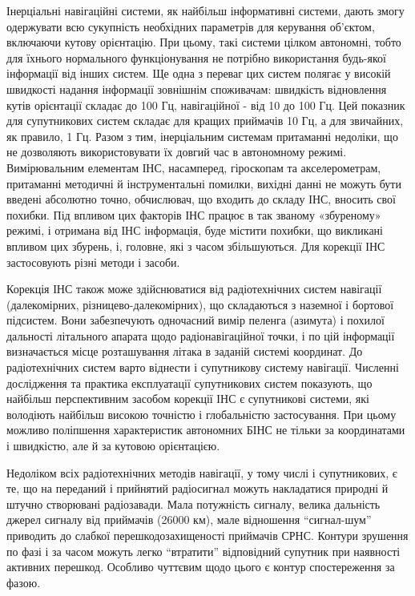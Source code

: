 Інерціальні навігаційні системи, як найбільш інформативні системи, дають 
змогу одержувати всю сукупність необхідних параметрів для керування об'єктом, 
включаючи кутову орієнтацію. При цьому, такі системи цілком автономні, 
тобто для їхнього нормального функціонування не потрібно використання 
будь-якої інформації від інших систем. Ще одна з переваг цих систем полягає 
у високій швидкості надання інформації зовнішнім споживачам: швидкість 
відновлення кутів орієнтації складає до 100 Гц, навігаційної - від 10 до 
100 Гц. Цей показник для супутникових систем складає для кращих приймачів 
10 Гц, а для звичайних, як правило, 1 Гц. Разом з тим, інерціальним системам 
притаманні недоліки, що не дозволяють використовувати їх довгий час в 
автономному режимі. Вимірювальним елементам ІНС, насамперед, гіроскопам 
та акселерометрам, притаманні методичні й інструментальні помилки, 
вихідні данні не можуть бути введені абсолютно точно, обчислювач, 
що входить до складу ІНС, вносить свої похибки. Під впливом цих факторів 
ІНС працює в так званому «збуреному» режимі, і отримана від ІНС інформація, 
буде містити похибки, що викликані впливом цих збурень, і, головне, які з 
часом збільшуються. Для корекції ІНС застосовують різні методи і засоби. 

Корекція ІНС також може здійснюватися від радіотехнічних систем навігації 
(далекомірних, різницево-далекомірних), що складаються з наземної і бортової 
підсистем. Вони забезпечують одночасний вимір пеленга (азимута) і похилої 
дальності літального апарата щодо радіонавігаційної точки, і по цій інформації 
визначається місце розташування літака в заданій системі координат. 
До радіотехнічних систем варто віднести і супутникову систему навігації. 
Численні дослідження та практика експлуатації супутникових систем показують, 
що найбільш перспективним засобом корекції ІНС є супутникові системи, які 
володіють найбільш високою точністю і глобальністю застосування. При цьому 
можливо поліпшення характеристик автономних БІНС не тільки за координатами 
і швидкістю, але й за кутовою орієнтацією. 

Недоліком всіх радіотехнічних методів навігації, у тому числі і супутникових, 
є те, що на переданий і прийнятий радіосигнал можуть накладатися природні й 
штучно створювані радіозавади. Мала потужність сигналу, велика дальність джерел 
сигналу від приймачів (26000 км), мале відношення “сигнал-шум” приводить 
до слабкої перешкодозахищеності приймачів СРНС. Контури зрушення по фазі 
і за часом можуть легко “втратити” відповідний супутник при наявності активних 
перешкод. Особливо чуттєвим щодо цього є контур спостереження за фазою. 

